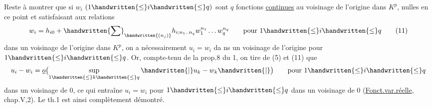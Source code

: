 Reste à montrer que si $w_i$ $(1\handwritten{\leq}i\handwritten{\leq}q)$ sont $q$ fonctions \uline{continues} au voisinage de l'origine dans ${K}^{p}$, nulles en ce point et satisfaisant aux relations
\[
w_i=h_{i0}+\handwritten{\sum}_{\handwritten{(n_j)}}h_{i;n_1\ldotp\ldotp n_q}w_1^{n_1}\ldots w_q^{n_q}
\qquad\text{pour }1\handwritten{\leq}i\handwritten{\leq}q
\tag*{(11)}
\]
dans un voisinage de l'origine dans $K^{p}$, on a nécessairement $u_i=w_i$ da ns un voisinage de l'origine pour $1\handwritten{\leq}i\handwritten{\leq}q$. Or, compte-tenu de la prop.8 du \handwritten{\S}1, on tire de (5) et (11) que
\[
u_i-w_i=\underline{o}\bigl(\sup_{1\handwritten{\leq}k\handwritten{\leq}q}\handwritten{|}u_k-w_k\handwritten{|}\bigr)
\qquad\text{pour }1\handwritten{\leq}i\handwritten{\leq}q
\]
dans un voisinage de $0$, ce qui entraîne $u_i=w_i$ pour $1\handwritten{\leq}i\handwritten{\leq}q$ dans un voisinage de $0$ (\uline{Fonct.var.réelle}, chap.V,\handwritten{\S}2). Le th.1 est ainsi complètement démontré.


